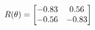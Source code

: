 \documentclass[preview]{standalone}
\begin{document}
\begin{align*}
\special{dvisvgm:raw <g id='unique000'>}R(\theta) = \begin{bmatrix}-0.83 & 0.56\\-0.56 & -0.83\end{bmatrix}\special{dvisvgm:raw </g>}
\end{align*}
\end{document}
